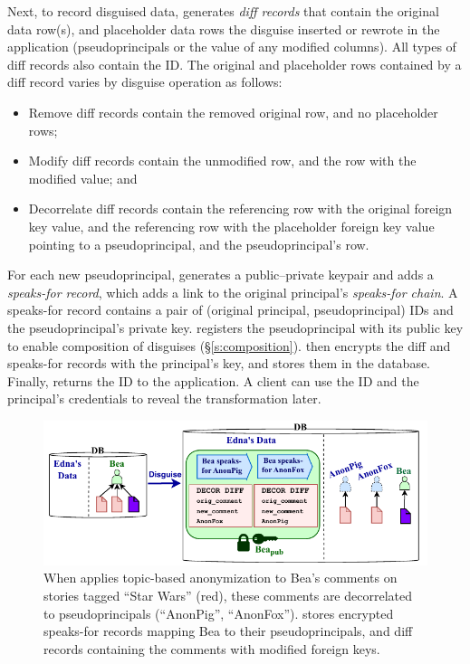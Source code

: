 %
Next, to record disguised data, \sys generates \emph{diff records} that contain \one{}
the original data row(s), and \two{} placeholder data rows the disguise inserted
or rewrote in the application (\eg pseudoprincipals or the value of any modified
columns).
%
All types of diff records also contain the \xx ID. 
%
The original and placeholder rows contained by a diff record varies by disguise
operation as follows:
\begin{itemize}[nosep]
    \item Remove diff records contain \one{} the removed original row, and \two{} no
        placeholder rows;
    \item Modify diff records contain \one{} the unmodified row, and \two{} the
        row with the modified value; and
    \item Decorrelate diff records contain \one{} the referencing row with the original
        foreign key value, and \two{} the referencing row with the placeholder
        foreign key value pointing to a pseudoprincipal, and the pseudoprincipal's row.
\end{itemize}
%
For each new pseudoprincipal, \sys generates a public--private keypair and adds
a \emph{speaks-for record}, which adds a link to the original principal's
\emph{speaks-for chain}.
A speaks-for record contains a pair of (original principal,
pseudoprincipal) IDs and the pseudoprincipal’s
private key. \sys registers the pseudoprincipal with its public key to enable
composition of disguises (\S\ref{s:composition}).
%
\sys then encrypts the diff and speaks-for records with the principal's key,
and stores them in the database.
%
%
%
Finally, \sys returns the \xx ID to the application.
%
A client can use the \xx ID and the principal's
credentials to reveal the transformation later.
%

\begin{figure}[!t]
\centering
\includegraphics{figs/lobsters_catanon_visual}
    \caption[Topic-based anonymization creates pseudoprincipals and
    disguise records.]{When \sys applies topic-based anonymization to Bea's comments on
    stories tagged ``Star Wars'' (red), these comments are decorrelated to
    pseudoprincipals (``AnonPig'', ``AnonFox''). \sys stores encrypted
    speaks-for records mapping Bea to their
    pseudoprincipals, and diff records containing the comments with
    modified foreign keys.}
\label{f:lobsters_visual}
\end{figure}


